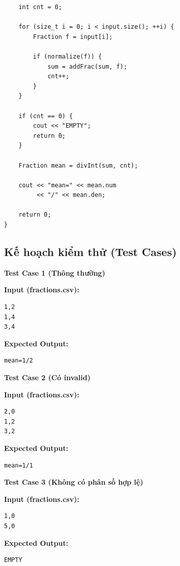 \begin{lstlisting}
    int cnt = 0;

    for (size_t i = 0; i < input.size(); ++i) {
        Fraction f = input[i];

        if (normalize(f)) {
            sum = addFrac(sum, f);
            cnt++;
        }
    }

    if (cnt == 0) {
        cout << "EMPTY";
        return 0;
    }

    Fraction mean = divInt(sum, cnt);

    cout << "mean=" << mean.num
         << "/" << mean.den;

    return 0;
}
\end{lstlisting}

\subsection{Kế hoạch kiểm thử (Test Cases)}

\textbf{Test Case 1 (Thông thường)}

\textbf{Input (fractions.csv):}
\begin{lstlisting}
1,2
1,4
3,4
\end{lstlisting}

\textbf{Expected Output:}
\begin{lstlisting}
mean=1/2
\end{lstlisting}

\vspace{0.5cm}

\textbf{Test Case 2 (Có invalid)}

\textbf{Input (fractions.csv):}
\begin{lstlisting}
2,0
1,2
3,2
\end{lstlisting}

\textbf{Expected Output:}
\begin{lstlisting}
mean=1/1
\end{lstlisting}

\vspace{0.5cm}

\textbf{Test Case 3 (Không có phân số hợp lệ)}

\textbf{Input (fractions.csv):}
\begin{lstlisting}
1,0
5,0
\end{lstlisting}

\textbf{Expected Output:}
\begin{lstlisting}
EMPTY
\end{lstlisting}